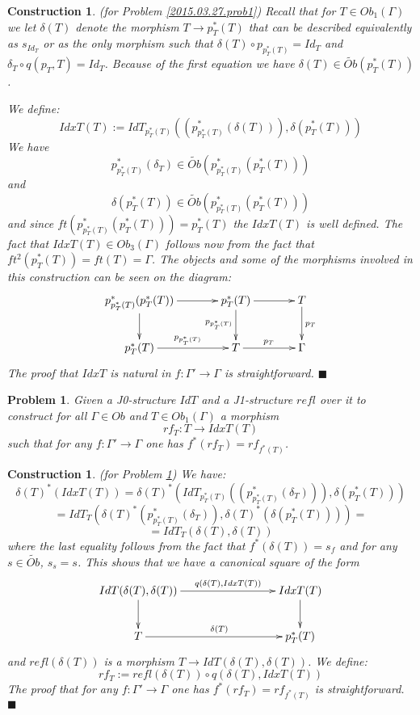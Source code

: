 \documentclass[12pt]{article}
\numberwithin{equation}{section}
\newenvironment{eq}{\begin{equation}}{\end{equation}}
\newtheorem{problem}[proposition]{Problem}
\newtheorem{construction0}[proposition]{Construction}
\newenvironment{construction}[1]{\begin{construction0}(for Problem \ref{#1})}{$\blacksquare$ \end{construction0}}
\newcommand{\llabel}[1]{\label{#1}}
\newcommand{\sr}{\rightarrow}
\newcommand{\wt}{\widetilde}
\begin{document}
\begin{construction}{2015.03.27.prob1}
\llabel{2015.03.27.constr1}\rm Recall that for $T\in Ob_1(\Gamma)$ we let
$\delta(T)$ denote the morphism $T\sr p_T^*(T)$ that can be described
equivalently as $s_{Id_T}$ or as the only morphism such that $\delta(T)\circ
p_{p_T^*(T)}=Id_T$ and $\delta_T\circ q(p_T,T)=Id_T$. Because of the first
equation we have $\delta(T)\in \wt{Ob}(p_T^*(T))$.

We define:
%
\begin{eq}
\llabel{2015.04.06.eq1}
IdxT(T):=IdT_{p_T^*(T)}((p_{p_T^*(T)}^*(\delta(T))), \delta(p_T^*(T)))
\end{eq}
%
We have
%
$$p_{p_T^*(T)}^*(\delta_T)\in \wt{Ob}(p_{p_T^*(T)}^*(p_T^*(T)))$$
%
and
%
$$\delta(p_T^*(T))\in \wt{Ob}(p_{p_T^*(T)}^*(p_T^*(T)))$$
%
and since $ft(p_{p_T^*(T)}^*(p_T^*(T)))=p_T^*(T)$ the $IdxT(T)$ is well
defined. The fact that $IdxT(T)\in Ob_3(\Gamma)$ follows now from the fact that
$ft^2(p_T^*(T))=ft(T)=\Gamma$. The objects and some of the morphisms involved
in this construction can be seen on the diagram:
%
$$
\begin{xy}
          \xymatrix@C=3pc{ p_{p_T^*(T)}^*(p_T^*(T)) \ar[r] \ar[d]& p_T^*(T)
            \ar[r] \ar[d]_{p_{p_T^*(T)}} & T \ar[d]^{p_T}\\ p_T^*(T)
            \ar[r]^{p_{p_T^*(T)}} & T \ar[r]^{p_T} & \Gamma }
\end{xy}
$$
%
The proof that $IdxT$ is natural in $f:\Gamma'\sr \Gamma$ is straightforward.
\end{construction}
%
%
\begin{problem}
\llabel{2015.03.27.prob2} Given a J0-structure $IdT$ and a J1-structure $refl$
over it to construct for all $\Gamma\in Ob$ and $T\in Ob_1(\Gamma)$ a morphism
%
$$rf_T:T\sr IdxT(T)$$
%
such that for any $f:\Gamma'\sr \Gamma$ one has $f^*(rf_T)=rf_{f^*(T)}$.
\end{problem}
%
\begin{construction}{2015.03.27.prob2}
\llabel{2015.03.27.constr2}\rm We have:
%
$$\delta(T)^*(IdxT(T))=\delta(T)^*(IdT_{p_T^*(T)}((p_{p_T^*(T)}^*(\delta_T))),\delta(p_T^*(T)))$$
$$=IdT_T(\delta(T)^*(p_{p_T^*(T)}^*(\delta_T)),\delta(T)^*(\delta(p_T^*(T))))=$$
$$=IdT_T(\delta(T),\delta(T))$$
%
where the last equality follows from the fact that $f^*(\delta(T))=s_f$ and for
any $s\in\wt{Ob}$, $s_s=s$.  This shows that we have a canonical square of the
form
%
\begin{eq}
\llabel{2015.03.31.eq3}
\begin{xy}
          \xymatrix@C=7pc{ IdT(\delta(T),\delta(T))
            \ar[r]^-{q(\delta(T),IdxT(T))} \ar[d] & IdxT(T) \ar[d]\\ T
            \ar[r]^{\delta(T)} & p_T^*(T) }
       \end{xy}
\end{eq}
%
and $refl(\delta(T))$ is a morphism $T\sr IdT(\delta(T),\delta(T))$. We define:
%
\begin{eq}
\llabel{2015.04.02.eq1} rf_T:=refl(\delta(T))\circ q(\delta(T),IdxT(T))
\end{eq}
%
The proof that for any $f:\Gamma'\sr \Gamma$ one has $f^*(rf_T)=rf_{f^*(T)}$ is
straightforward.
\end{construction}
\end{document}
